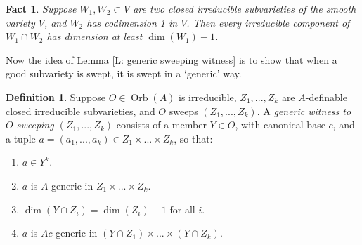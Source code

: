 \documentclass{amsart}
\newtheorem{fact}[theorem]{Fact}
\theoremstyle{definition}
\newtheorem{definition}[theorem]{Definition}
\begin{document}
\begin{fact}\label{F: dimension theorem}\cite[\href{https://stacks.math.columbia.edu/tag/0AZP}{Lemma 0AZP}]{stacks-project} Suppose $W_1,W_2\subset V$ are two closed irreducible subvarieties of the smooth variety $V$, and $W_2$ has codimension 1 in $V$. Then every irreducible component of $W_1\cap W_2$ has dimension at least $\dim(W_1)-1$.
\end{fact}

Now the idea of Lemma \ref{L: generic sweeping witness} is to show that when a good subvariety is swept, it is swept in a `generic' way.

\begin{definition}\label{D: generic sweeping witness}
    Suppose $O\in\operatorname{Orb}(A)$ is irreducible, $Z_1,...,Z_k$ are $A$-definable closed irreducible subvarieties, and $O$ sweeps $(Z_1,...,Z_k)$. A \textit{generic witness to $O$ sweeping $(Z_1,...,Z_k)$} consists of a member $Y\in O$, with canonical base $c$, and a tuple $a=(a_1,...,a_k)\in Z_1\times...\times Z_k$, so that:
    \begin{enumerate}
        \item $a\in Y^k$.
    \item $a$ is $A$-generic in $Z_1\times...\times Z_k$.
    \item $\dim(Y\cap Z_i)=\dim(Z_i)-1$ for all $i$.
    \item $a$ is $Ac$-generic in $(Y\cap Z_1)\times...\times(Y\cap Z_k)$.
    \end{enumerate}
\end{definition}
\end{document}
